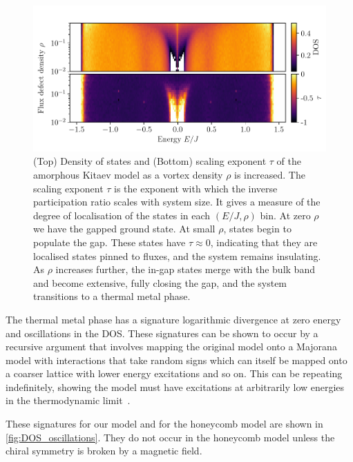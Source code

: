 \hypertarget{fig:DOS_vs_rho}{%
\begin{figure}
\centering
\includegraphics[width=1\textwidth,height=\textheight]{figure_code/amk_chapter/results/DOS_vs_rho/DOS_vs_rho}
\caption[{Transition to a Thermal Metal}]{(Top) Density of states and (Bottom) scaling exponent \(\tau\) of the amorphous Kitaev model as a vortex density \(\rho\) is increased. The scaling exponent \(\tau\) is the exponent with which the inverse participation ratio scales with system size. It gives a measure of the degree of localisation of the states in each \((E/J, \rho)\) bin. At zero \(\rho\) we have the gapped ground state. At small \(\rho\), states begin to populate the gap. These states have \(\tau\approx0\), indicating that they are localised states pinned to fluxes, and the system remains insulating. As \(\rho\) increases further, the in-gap states merge with the bulk band and become extensive, fully closing the gap, and the system transitions to a thermal metal phase.}
\label{fig:DOS_vs_rho}
\end{figure}
}

The thermal metal phase has a signature logarithmic divergence at zero energy and oscillations in the DOS. These signatures can be shown to occur by a recursive argument that involves mapping the original model onto a Majorana model with interactions that take random signs which can itself be mapped onto a coarser lattice with lower energy excitations and so on. This can be repeating indefinitely, showing the model must have excitations at arbitrarily low energies in the thermodynamic limit~\autocite{bocquet_disordered_2000,selfThermallyInducedMetallic2019}.

These signatures for our model and for the honeycomb model are shown in \cref{fig:DOS_oscillations}. They do not occur in the honeycomb model unless the chiral symmetry is broken by a magnetic field.

